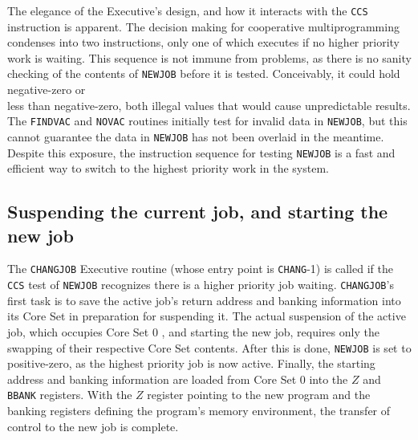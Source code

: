 \documentclass[refcap, oxford]{ahsan}
\begin{document}
The elegance of the Executive's design, and how it interacts with the \texttt{CCS} instruction is apparent. The decision making for cooperative multiprogramming condenses into two instructions, only one of which executes if no higher priority work is waiting. This sequence is not immune from problems, as there is no sanity checking of the contents of \texttt{NEWJOB} before it is tested. Conceivably, it could hold negative-zero or\\
less than negative-zero, both illegal values that would cause unpredictable results. The \texttt{FINDVAC} and \texttt{NOVAC} routines initially test for invalid data in \texttt{NEWJOB}, but this cannot guarantee the data in \texttt{NEWJOB} has not been overlaid in the meantime. Despite this exposure, the instruction sequence for testing \texttt{NEWJOB} is a fast and efficient way to switch to the highest priority work in the system.


\subsection{Suspending the current job, and starting the new job}
The \texttt{CHANGJOB} Executive routine (whose entry point is \texttt{CHANG}-1) is called if the \texttt{CCS} test of \texttt{NEWJOB} recognizes there is a higher priority job waiting. \texttt{CHANGJOB}'s first task is to save the active job's return address and banking information into its Core Set in preparation for suspending it. The actual suspension of the active job, which occupies Core Set 0 , and starting the new job, requires only the swapping of their respective Core Set contents. After this is done, \texttt{NEWJOB} is set to positive-zero, as the highest priority job is now active. Finally, the starting address and banking information are loaded from Core Set 0 into the $Z$ and \texttt{BBANK} registers. With the $Z$ register pointing to the new program and the banking registers defining the program's memory environment, the transfer of control to the new job is complete.
\end{document}
